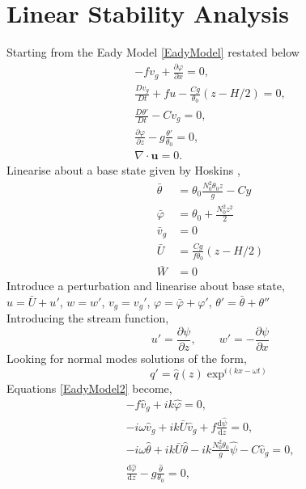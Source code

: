 \section{Linear Stability Analysis}
Starting from the Eady Model \ref{EadyModel} restated below
\begin{equation}
	\begin{aligned}
	-fv_g + \frac{\partial \varphi}{\partial x} = 0,\\
	\frac{Dv_g}{Dt} + fu -\frac{Cg}{\theta _0}\left(z-H/2\right) = 0,\\
	\frac{D\theta'}{Dt} - Cv_g = 0,\\
	\frac{\partial \varphi}{\partial z} - g\frac{\theta'}{\theta_0} = 0,\\
	\nabla \cdot \bm{u} = 0.
	\end{aligned}
\label{EadyModel2}
\end{equation} 
Linearise about a base state given by Hoskins \cite{Hoskins1975},
\begin{equation}
	\begin{aligned}
		\bar{\theta} &= \theta_0 \frac{N_0^2\theta_0 z}{g} - Cy \\
		\bar{\varphi} &= \theta_0 + \frac{N_0^2 z^2}{2}\\
		\bar{v}_g &= 0\\
		\bar{U} &= \frac{Cg}{f\theta_0}\left(z - H/2\right)\\
		\bar{W} &= 0 
	\end{aligned}
\end{equation}
Introduce a perturbation and linearise about base state,\\
$u = \bar{U} + u'$, $w = w'$, $v_g =  v_g'$, $\varphi = \bar{\varphi} + \varphi'$, $\theta ' = \bar{\theta} + \theta ''$\\
Introducing the stream function,
\begin{equation}
	u' = \frac{\partial \psi}{\partial z},\qquad w' = -\frac{\partial \psi}{\partial x} 
\end{equation}
Looking for normal modes solutions of the form,
\begin{equation}
q' = \hat{q}(z)\exp^{i \left(kx - \omega t\right)}
\end{equation}
Equations \ref{EadyModel2} become,
\begin{align}
 		-f\hat{v}_g + ik\hat{\varphi} = 0,\label{stab1}\\
 	-i\omega \hat{v}_g + ik\bar{U}\hat{v}_g + f\frac{\text{d}\hat{\psi}}{\text{d}z} = 0,\label{stab2}\\
 	-i \omega \hat{\theta} + i k \bar{U} \hat{\theta} - ik\frac{N_0^2\theta_0}{g} \hat{\psi} - C\hat{v}_g = 0,\label{stab3}\\
 	\frac{\text{d}\hat{\varphi}}{\text{d}z} - g\frac{\hat{\theta}}{\theta_0} = 0 \label{stab4},
\end{align}
